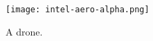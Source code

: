 \begin{figure}[h]
\begin{center}
	\texttt{[image: intel-aero-alpha.png]} \\
	\caption{A drone. \label{fig:simplefig}}
\end{center}
\end{figure}